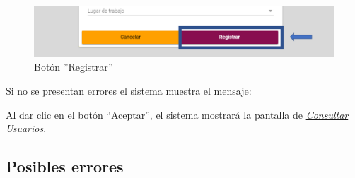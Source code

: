             \begin{figure}[!hbtp]
                \centering
                \hypertarget{btnreg}{\includegraphics[width=0.7\linewidth]{images/SP5/BtnRegistrar}}
                \caption{Botón ''Registrar''}
                \label{btnreg}
            \end{figure}
            
            Si no se presentan errores el sistema muestra el mensaje:
            
        
            Al dar clic en el botón “Aceptar”, el sistema mostrará la pantalla de  \hyperlink{consultarUs}{\textit{Consultar Usuarios}}.
    
            \subsection{Posibles errores} 
        
